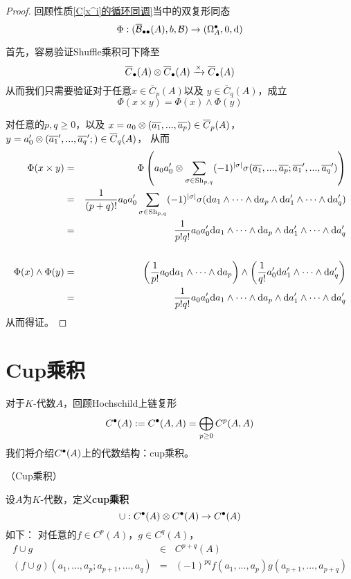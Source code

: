 \begin{proof}
回顾性质\ref{C[x^i]的循环同调}当中的双复形同态
$$\Phi:(\overline{\mathcal{B}}_{\bullet\bullet}(A),b,\mathcal{B})
\to(\Omega^{\bullet}_A,0,\mathrm{d})$$

首先，容易验证Shuffle乘积可下降至
$$\overline{C}_{\bullet}(A)\otimes\overline{C}_{\bullet}(A)
\xrightarrow{\times}\overline{C}_{\bullet}(A)$$
从而我们只需要验证对于任意$x\in\overline{C}_p(A)$以及
$y\in\overline{C}_q(A)$，成立
$$\Phi(x\times y)=\Phi(x)\wedge\Phi(y)$$

对任意的$p,q\geq 0$，以及
$x=a_0\otimes(\overline{a_1},...,\overline{a_p})\in\overline{C}_p(A)$，
$y=a_0'\otimes(\overline{a_1}',...,\overline{a_q}';)\in\overline{C}_q(A)$，
从而
\begin{eqnarray*}
     \Phi(x\times y)
&=&
     \Phi\left(
            a_0a_0'\otimes
            \sum_{\sigma\in\operatorname{Sh}_{p,q}}(-1)^{|\sigma|}
              \sigma(\overline{a_1},...,\overline{a_p};
                   \overline{a_1}',...,\overline{a_q}')
         \right)\\
&=&
     \frac{1}{(p+q)!}a_0a_0'
     \sum_{\sigma\in\operatorname{Sh}_{p,q}}(-1)^{|\sigma|}
       \sigma(\mathrm{d} a_1\wedge\cdots\wedge \mathrm{d} a_p
         \wedge \mathrm{d} a_1'\wedge\cdots\wedge\mathrm{d} a_q')\\
&=&
     \frac{1}{p!q!}
     a_0a_0'\mathrm{d} a_1\wedge\cdots\wedge \mathrm{d} a_p
     \wedge \mathrm{d} a_1'\wedge\cdots\wedge\mathrm{d} a_q'\\
& &
     \\
     \Phi(x)\wedge\Phi(y)
&=&
     \left(
       \frac{1}{p!}
       a_0\mathrm{d} a_1\wedge\cdots\wedge \mathrm{d} a_p
     \right)
     \wedge
     \left(
       \frac{1}{q!}
       a_0'\mathrm{d} a_1'\wedge\cdots\wedge \mathrm{d} a_q'
     \right)\\
&=&
     \frac{1}{p!q!}
     a_0a_0'\mathrm{d} a_1\wedge\cdots\wedge \mathrm{d} a_p
     \wedge \mathrm{d} a_1'\wedge\cdots\wedge\mathrm{d} a_q'
\end{eqnarray*}
从而得证。
\end{proof}


\section{Cup乘积}
对于$K$-代数$A$，回顾Hochschild上链复形
$$C^{\bullet}(A):=C^{\bullet}(A,A)=\bigoplus_{p\geq 0}C^p(A,A)$$
我们将介绍$C^{\bullet}(A)$上的代数结构：cup乘积。


\begin{definition}（Cup乘积）

设$A$为$K$-代数，定义\textbf{cup乘积}
$$\cup:C^{\bullet}(A)\otimes C^{\bullet}(A)\to C^{\bullet}(A)$$
如下：%
对任意的$f\in C^p(A)$，$g\in C^q(A)$，%
\begin{eqnarray*}
f\cup g &\in& C^{p+q}(A)\\
(f\cup g)(a_1,...,a_p;a_{p+1},...,a_q)
&=&
(-1)^{pq}f(a_1,...,a_p)g(a_{p+1},...,a_{p+q})
\end{eqnarray*}
\end{definition}

